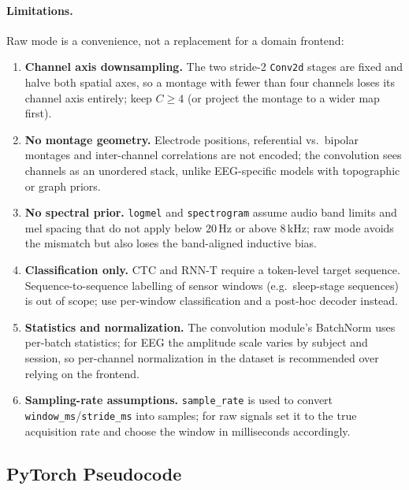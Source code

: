 \paragraph{Limitations.} Raw mode is a convenience, not a replacement for a domain frontend:
\begin{enumerate}[leftmargin=*]
    \item \textbf{Channel axis downsampling.} The two stride-2 \texttt{Conv2d} stages are fixed and halve both spatial axes, so a montage with fewer than four channels loses its channel axis entirely; keep $C \geq 4$ (or project the montage to a wider map first).
    \item \textbf{No montage geometry.} Electrode positions, referential vs.\ bipolar montages and inter-channel correlations are not encoded; the convolution sees channels as an unordered stack, unlike EEG-specific models with topographic or graph priors.
    \item \textbf{No spectral prior.} \texttt{logmel} and \texttt{spectrogram} assume audio band limits and mel spacing that do not apply below 20\,Hz or above 8\,kHz; raw mode avoids the mismatch but also loses the band-aligned inductive bias.
    \item \textbf{Classification only.} CTC and RNN-T require a token-level target sequence. Sequence-to-sequence labelling of sensor windows (e.g.\ sleep-stage sequences) is out of scope; use per-window classification and a post-hoc decoder instead.
    \item \textbf{Statistics and normalization.} The convolution module's BatchNorm uses per-batch statistics; for EEG the amplitude scale varies by subject and session, so per-channel normalization in the dataset is recommended over relying on the frontend.
    \item \textbf{Sampling-rate assumptions.} \texttt{sample\_rate} is used to convert \texttt{window\_ms}/\texttt{stride\_ms} into samples; for raw signals set it to the true acquisition rate and choose the window in milliseconds accordingly.
\end{enumerate}

\subsection{PyTorch Pseudocode}

